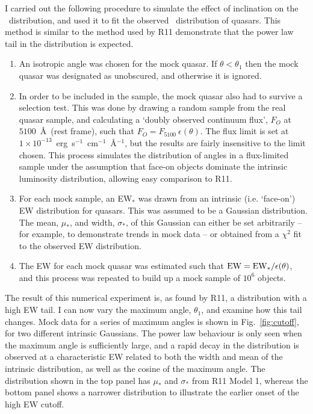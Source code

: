 I carried out the following procedure to simulate
the effect of inclination on the \ewo\ distribution, and used it to fit the
observed \ewo\ distribution of quasars.
This method is similar to the method used by R11 demonstrate that the power
law tail in the distribution is expected.
\begin{enumerate}
	\setlength\itemsep{1em}
	\item An isotropic angle was chosen for the mock quasar. 
	If $\theta<\theta_{1}$ then the mock quasar was designated as unobscured, 
	and otherwise it is ignored. 
	\item In order to be included in the sample, the mock quasar also had to 
	survive a selection test. This was done by drawing a random sample from the real quasar sample, 
	and calculating a `doubly observed continuum flux', $F_O$ at $5100$~\AA\ 
	(rest frame), such that $F_O = F_{5100}~\epsilon(\theta)$. The flux limit
	is set at $1\times10^{-13}$~erg~s$^{-1}$~cm$^{-1}$~\AA$^{-1}$, but the results
	are fairly insensitive to the limit chosen. This process simulates the 
	distribution of angles in a flux-limited sample under the assumption that face-on objects
	dominate the intrinsic luminosity distribution, allowing easy comparison to R11.
	\item For each mock sample, an EW$_*$ was drawn from an intrinsic 
	(i.e. `face-on') EW distribution for quasars. This was assumed to be a
	Gaussian distribution. The mean, $\mu_*$, and width, $\sigma_*$, of this Gaussian
	can either be set arbitrarily -- for example, to demonstrate trends
	in mock data -- or obtained from a $\chi^2$ fit to the observed EW
	distribution.
	\item The EW for each mock quasar 
	was estimated such that ${\rm EW} = {\rm EW}_* / \epsilon(\theta)$,
	and this process was repeated to build up a mock sample of $10^6$ objects.
\end{enumerate}
The result of this numerical experiment is, as found by R11, a distribution
with a high EW tail. I can now vary the maximum angle, $\theta_1$,
and examine how this tail changes. Mock data for a series
of maximum angles is shown in Fig.~\ref{fig:cutoff}, for two different intrinsic 
Gaussians. The power law behaviour is only seen when the maximum angle is
sufficiently large, and a rapid decay in the distribution is observed
at a characteristic EW related to both the width and mean of the
intrinsic distribution, as well as the cosine of the maximum angle.
The distribution shown in the top panel has $\mu_*$ and $\sigma_*$ from R11 Model 1, 
whereas the bottom panel shows a narrower distribution to illustrate the 
earlier onset of the high EW cutoff. 


